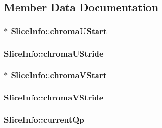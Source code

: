 \subsection{Member Data Documentation}
\hypertarget{struct_slice_info_af7fed88b468688e22348e78896516fe0}{
\subsubsection[{chromaUStart}]{$\ast$ {\bf SliceInfo::chromaUStart}}}
\label{struct_slice_info_af7fed88b468688e22348e78896516fe0}
\hypertarget{struct_slice_info_add4ff10c8027be3c700e5ee78d7b6a25}{
\subsubsection[{chromaUStride}]{ {\bf SliceInfo::chromaUStride}}}
\label{struct_slice_info_add4ff10c8027be3c700e5ee78d7b6a25}
\hypertarget{struct_slice_info_a8938e41b2640816d38facbece73e2bf5}{
\subsubsection[{chromaVStart}]{$\ast$ {\bf SliceInfo::chromaVStart}}}
\label{struct_slice_info_a8938e41b2640816d38facbece73e2bf5}
\hypertarget{struct_slice_info_a4a2fc013181cb2501d38151cbd20bd5c}{
\subsubsection[{chromaVStride}]{ {\bf SliceInfo::chromaVStride}}}
\label{struct_slice_info_a4a2fc013181cb2501d38151cbd20bd5c}
\hypertarget{struct_slice_info_aba609ae5413fe55caccca867397da19f}{
\subsubsection[{currentQp}]{ {\bf SliceInfo::currentQp}}}

